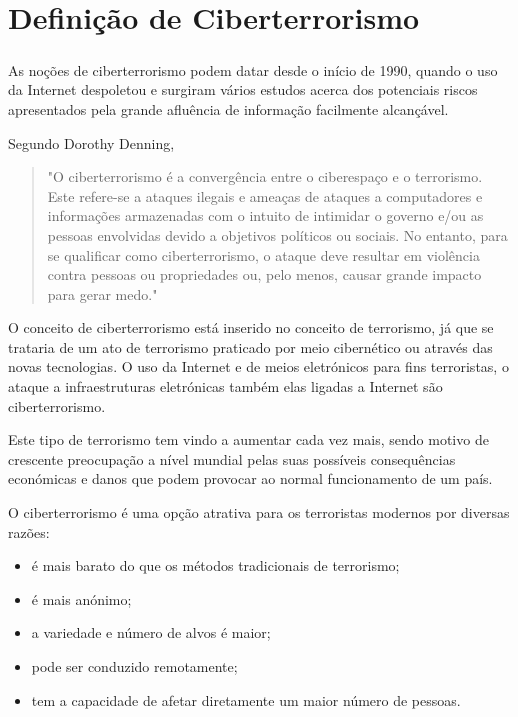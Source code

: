 \documentclass{report}
\begin{document}
\chapter{Definição de Ciberterrorismo}
\label{chap.Definição de Ciberterrorismo}
\paragraph{} As noções de ciberterrorismo podem datar desde o início de 1990, quando o uso da Internet despoletou e surgiram vários estudos acerca dos potenciais riscos apresentados pela grande afluência de informação facilmente alcançável.\par 
Segundo Dorothy Denning,
\begin {quotation}
"O ciberterrorismo é a convergência entre o ciberespaço e o terrorismo. Este refere-se a ataques ilegais e ameaças de ataques a computadores e informações armazenadas com o intuito de intimidar o governo e/ou as pessoas envolvidas devido a objetivos políticos ou sociais. No entanto, para se qualificar como ciberterrorismo, o ataque deve resultar em violência contra pessoas ou propriedades ou, pelo menos, causar grande impacto para gerar medo."
\end {quotation}
\par
O conceito de ciberterrorismo está inserido no conceito de terrorismo, já que se trataria de um ato de terrorismo praticado por meio cibernético ou através das novas tecnologias. O uso da Internet e de meios eletrónicos para fins terroristas, o ataque a infraestruturas eletrónicas também elas ligadas a Internet são ciberterrorismo.\par
Este tipo de terrorismo tem vindo a aumentar cada vez mais, sendo motivo de crescente preocupação a nível mundial pelas suas possíveis consequências económicas e danos que podem provocar ao normal funcionamento de um país.\par
O ciberterrorismo é uma opção atrativa para os terroristas modernos por diversas razões:
\begin{itemize}
  \item é mais barato do que os métodos tradicionais de terrorismo;
  \item é mais anónimo;
  \item a variedade e número de alvos é maior;
  \item pode ser conduzido remotamente;
  \item tem a capacidade de afetar diretamente um maior número de pessoas.
\end{itemize}
\end{document}
